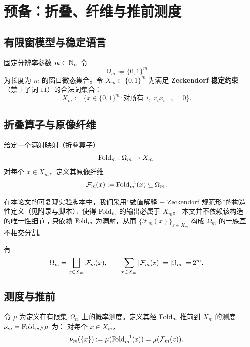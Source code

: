 \section{预备：折叠、纤维与推前测度}

\subsection{有限窗模型与稳定语言}

固定分辨率参数 $m\in\mathbb{N}$。令
$$
\Omega_m:=\{0,1\}^m
$$
为长度为 $m$ 的窗口微态集合。令 $X_m\subset\{0,1\}^m$ 为满足 \textbf{Zeckendorf 稳定约束}（禁止子词 $11$）的合法词集合：
$$
X_m:=\{x\in\{0,1\}^m:\text{对所有 }i,\; x_i x_{i+1}=0\}.
$$

\subsection{折叠算子与原像纤维}

\begin{definition}[折叠算子与原像纤维]
\label{def:fold_and_fiber}
给定一个满射映射（折叠算子）
$$
\mathrm{Fold}_m:\Omega_m\twoheadrightarrow X_m.
$$
对每个 $x\in X_m$，定义其原像纤维
$$
\mathcal F_m(x):=\mathrm{Fold}_m^{-1}(x)\subseteq \Omega_m.
$$
\end{definition}

\begin{remark}
在本论文的可复现实验脚本中，我们采用“数值解释 + Zeckendorf 规范形”的构造性定义（见附录与脚本），使得 $\mathrm{Fold}_m$ 的输出必属于 $X_m$。
本文并不依赖该构造的唯一性细节；只依赖 $\mathrm{Fold}_m$ 为满射，从而 $\{\mathcal F_m(x)\}_{x\in X_m}$ 构成 $\Omega_m$ 的一族互不相交分割。
\end{remark}

\begin{proposition}[分割恒等式]
\label{prop:partition_identity}
有
$$
\Omega_m=\bigsqcup_{x\in X_m}\mathcal F_m(x),
\qquad
\sum_{x\in X_m}\left\lvert \mathcal F_m(x)\right\rvert=\left\lvert \Omega_m\right\rvert=2^m.
$$
\end{proposition}

\subsection{测度与推前}

\begin{definition}[推前测度]
\label{def:pushforward_measure}
令 $\mu$ 为定义在有限集 $\Omega_m$ 上的概率测度。定义其经 $\mathrm{Fold}_m$ 推前到 $X_m$ 的测度 $\nu_m=\mathrm{Fold}_{m\#}\mu$ 为：
对每个 $x\in X_m$，
$$
\nu_m(\{x\}) := \mu(\mathrm{Fold}_m^{-1}(x)) = \mu(\mathcal F_m(x)).
$$
\end{definition}

